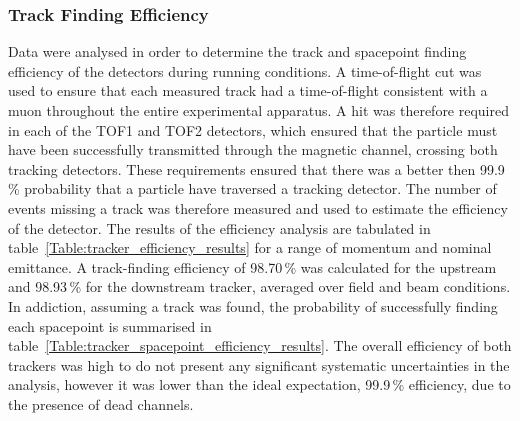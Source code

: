 \subsubsection{Track Finding Efficiency}
\label{trackers:performance:efficiency}
Data were analysed in order to determine the track and spacepoint finding efficiency of the detectors during running conditions. A time-of-flight cut was used to ensure that each measured track had a time-of-flight consistent with a muon throughout the entire experimental apparatus. A hit was therefore required in each of the TOF1 and TOF2 detectors, which ensured that the particle must have been successfully transmitted through the magnetic channel, crossing both tracking detectors. These requirements ensured that there was a better then 99.9\,\% probability that a particle have traversed a tracking detector.
The number of events missing a track was therefore measured and used to estimate the efficiency of the detector.
The results of the efficiency analysis are tabulated in table~\ref{Table:tracker_efficiency_results} for a range of momentum and nominal emittance. A track-finding efficiency of 98.70\,\% was calculated for the upstream and 98.93\,\% for the downstream tracker, averaged over field and beam conditions. In addiction, assuming a track was found, the probability of successfully finding each spacepoint is summarised in table~\ref{Table:tracker_spacepoint_efficiency_results}. The overall efficiency of both trackers was high to do not present any significant systematic uncertainties in the analysis, however it was lower than the ideal expectation, 99.9\,\% efficiency, due to the presence of dead channels.

